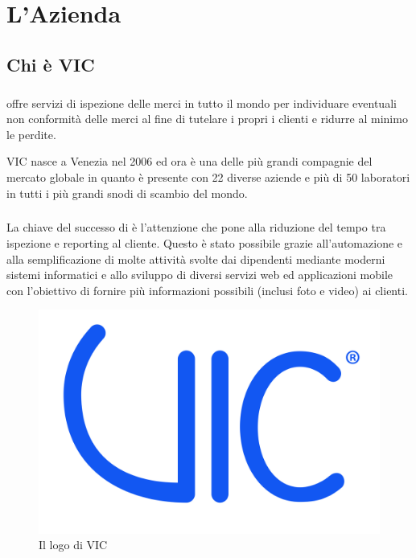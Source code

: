 
\chapter{L'Azienda}
\label{cap:azienda}



\section{Chi è VIC} %
	\paragraph{} 
	\vic{}\cite{site:vic} offre servizi di ispezione delle merci in tutto il mondo per individuare eventuali non conformità delle merci al fine di tutelare i propri i clienti e ridurre al minimo le perdite.
	
	VIC nasce a Venezia nel 2006 ed ora è una delle più grandi compagnie del mercato globale in quanto 
	è presente con 22 diverse aziende e più di 50 laboratori in tutti i più grandi snodi di scambio del mondo.
	
	\paragraph{} La chiave del successo di \vic{} è l'attenzione che pone alla riduzione del tempo tra ispezione e reporting al cliente. 
	Questo è stato possibile grazie all'automazione e alla semplificazione di molte attività svolte dai dipendenti mediante moderni sistemi
	informatici e allo sviluppo di diversi servizi web ed applicazioni mobile con l’obiettivo di fornire più informazioni possibili (inclusi foto e video) ai clienti.
	
	
	\begin{figure}[ht]
		\centering
		\includegraphics[width=0.5\linewidth]{immagini/logo-vic}
		\caption{Il logo di VIC}
		\label{fig:logo-vic}
	\end{figure}
	 

